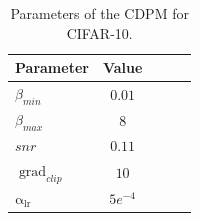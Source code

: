 \documentclass[letterpaper,11pt,reqno]{amsart}
\numberwithin{equation}{section}
\begin{document}
\begin{table}[!htbp]
\centering
\begin{tabular}{l c c c c}
    \toprule
        Parameter & Value\\
         \midrule
        $\beta_{min} $ & $0.01$\\
        $\beta_{max} $ & $8$\\
        $snr$ & $0.11$\\
        $\operatorname{grad}_{clip} $ & $10$\\
        $\operatorname{\alpha_{lr}}$ & $5e^{-4}$\\
    \bottomrule
\end{tabular}
\caption{Parameters of the CDPM for CIFAR-10.}
\end{table}




\end{document}
